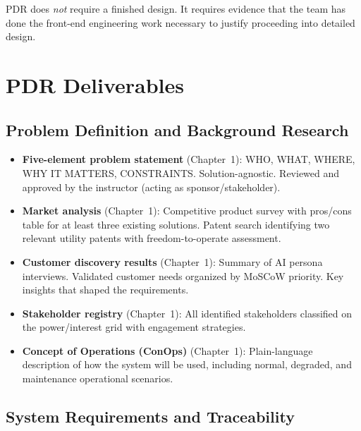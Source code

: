 \documentclass[11pt,letterpaper,twoside,openany]{book}
\begin{document}
PDR does \emph{not} require a finished design. It requires evidence that the team has done the front-end engineering work necessary to justify proceeding into detailed design.

\FloatBarrier
\section{PDR Deliverables}

\subsection{Problem Definition and Background Research}

\begin{itemize}[leftmargin=1.5em]
\item \textbf{Five-element problem statement} (Chapter~1): WHO, WHAT, WHERE, WHY IT MATTERS, CONSTRAINTS. Solution-agnostic. Reviewed and approved by the instructor (acting as sponsor/stakeholder).
\item \textbf{Market analysis} (Chapter~1): Competitive product survey with pros/cons table for at least three existing solutions. Patent search identifying two relevant utility patents with freedom-to-operate assessment.
\item \textbf{Customer discovery results} (Chapter~1): Summary of AI persona interviews. Validated customer needs organized by MoSCoW priority. Key insights that shaped the requirements.
\item \textbf{Stakeholder registry} (Chapter~1): All identified stakeholders classified on the power/interest grid with engagement strategies.
\item \textbf{Concept of Operations (ConOps)} (Chapter~1): Plain-language description of how the system will be used, including normal, degraded, and maintenance operational scenarios.
\end{itemize}

\subsection{System Requirements and Traceability}
\end{document}

